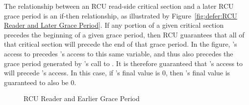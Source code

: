 The relationship between an RCU read-side critical section and a later
RCU grace period is an if-then relationship, as illustrated by
Figure~\ref{fig:defer:RCU Reader and Later Grace Period}.
If any portion of a given critical section precedes the beginning of
a given grace period, then RCU guarantees that all of that critical
section will precede the end of that grace period.
In the figure, 's access to  precedes 's access
to this same variable, and thus also precedes the grace period generated
by 's call to .
It is therefore guaranteed that 's access to  will precede
's access.
In this case, if 's final value is 0, then 's final value
is guaranteed to also be 0.

\QuickQuizEnd

\begin{figure}
\centering
{}
\caption{RCU Reader and Earlier Grace Period}
\label{fig:defer:RCU Reader and Earlier Grace Period}
\end{figure}

